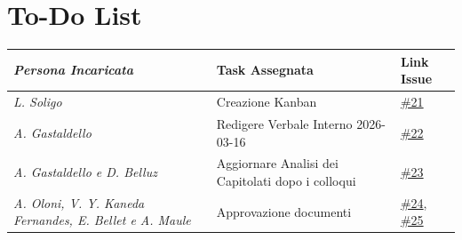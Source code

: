 \documentclass[a4paper,12pt]{article}
\begin{document}
\section{To-Do List}
\begin{table}[h]
    \centering
    \begin{tabular}{|p{4.2cm}|p{5cm}|l|}
    \hline
        \rowcolor{lightgray}\textit{\textbf{Persona Incaricata}}  & \textbf{Task Assegnata} &\textbf{Link Issue} \\
    \hline
        \textit{L. Soligo} & Creazione Kanban & \href{https://github.com/aLittleByte-19/Documentazione/issues/21}{\#21}\\
    \hline
        \textit{A. Gastaldello} & Redigere Verbale Interno 2026-03-16 & \href{https://github.com/aLittleByte-19/Documentazione/issues/22}{\#22}\\
    \hline
        \textit{A. Gastaldello e D. Belluz} & Aggiornare Analisi dei Capitolati dopo i colloqui & \href{https://github.com/aLittleByte-19/Documentazione/issues/23}{\#23}\\
    \hline
        \textit{A. Oloni, V. Y. Kaneda Fernandes, E. Bellet e A. Maule} & Approvazione documenti & \href{https://github.com/aLittleByte-19/Documentazione/issues/24}{\#24}, \href{https://github.com/aLittleByte-19/Documentazione/issues/25}{\#25}\\
    \hline
    \end{tabular}
    \label{tab:todo}
\end{table}
\end{document}
